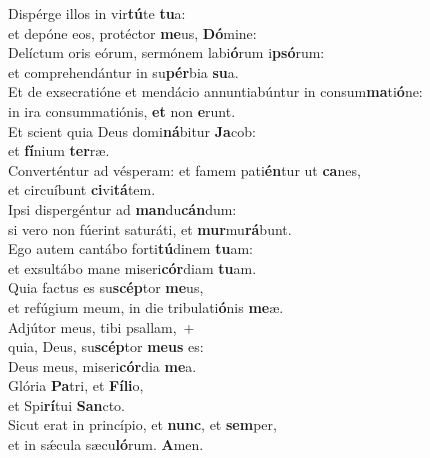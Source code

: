 \evenverse Dispérge illos in vir\textbf{tú}te \textbf{tu}a:~\*\\
\evenverse et depóne eos, protéctor \textbf{me}us, \textbf{Dó}mine:\\
\oddverse Delíctum oris eórum, sermónem labi\textbf{ó}rum i\textbf{psó}rum:~\*\\
\oddverse et comprehendántur in su\textbf{pér}bia \textbf{su}a.\\
\evenverse Et de exsecratióne et mendácio annuntiabúntur in consum\textbf{ma}ti\textbf{ó}ne:~\*\\
\evenverse in ira consummatiónis, \textbf{et} non \textbf{e}runt.\\
\oddverse Et scient quia Deus domi\textbf{ná}bitur \textbf{Ja}cob:~\*\\
\oddverse et \textbf{fí}nium \textbf{ter}ræ.\\
\evenverse Converténtur ad vésperam: et famem pati\textbf{én}tur ut \textbf{ca}nes,~\*\\
\evenverse et circuíbunt \textbf{ci}vi\textbf{tá}tem.\\
\oddverse Ipsi dispergéntur ad \textbf{man}du\textbf{cán}dum:~\*\\
\oddverse si vero non fúerint saturáti, et \textbf{mur}mu\textbf{rá}bunt.\\
\evenverse Ego autem cantábo forti\textbf{tú}dinem \textbf{tu}am:~\*\\
\evenverse et exsultábo mane miseri\textbf{cór}diam \textbf{tu}am.\\
\oddverse Quia factus es su\textbf{scép}tor \textbf{me}us,~\*\\
\oddverse et refúgium meum, in die tribulati\textbf{ó}nis \textbf{me}æ.\\
\evenverse Adjútor meus, tibi psallam,~+\\
\evenverse  quia, Deus, su\textbf{scép}tor \textbf{me}\textbf{us} es:~\*\\
\evenverse Deus meus, miseri\textbf{cór}dia \textbf{me}a.\\
\oddverse Glória \textbf{Pa}tri, et \textbf{Fí}\textbf{li}o,~\*\\
\oddverse et Spi\textbf{rí}tui \textbf{San}cto.\\
\evenverse Sicut erat in princípio, et \textbf{nunc}, et \textbf{sem}per,~\*\\
\evenverse et in sǽcula sæcu\textbf{ló}rum. \textbf{A}men.\\
